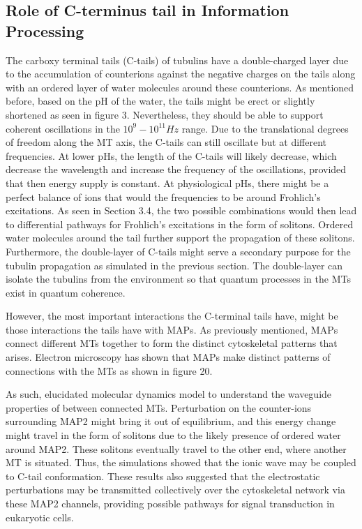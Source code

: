 \documentclass[letterpaper,final,times]{cas-dc}
\numberwithin{equation}{section}
\begin{document}
\subsection{Role of C-terminus tail in Information Processing}\noindent
The carboxy terminal tails (C-tails) of tubulins have a double-charged layer due to the accumulation of counterions against the negative charges on the tails along with an ordered layer of water molecules around these counterions. As mentioned before, based on the pH of the water, the tails might be erect or slightly shortened as seen in figure 3. Nevertheless, they should be able to support coherent oscillations in the $10^9 - 10^{11} Hz$ range\citep{94}. Due to the translational degrees of freedom along the MT axis, the C-tails can still oscillate but at different frequencies. At lower pHs, the length of the C-tails will likely decrease, which decrease the wavelength and increase the frequency of the oscillations, provided that then energy supply is constant. At physiological pHs, there might be a perfect balance of ions that would the frequencies to be around Frohlich’s excitations. As seen in Section 3.4, the two possible combinations would then lead to differential pathways for Frohlich’s excitations in the form of solitons. Ordered water molecules around the tail further support the propagation of these solitons. Furthermore, the double-layer of C-tails might serve a secondary purpose for the tubulin propagation as simulated in the previous section. The double-layer can isolate the tubulins from the environment so that quantum processes in the MTs exist in quantum coherence.

However, the most important interactions the C-terminal tails have, might be those interactions the tails have with MAPs. As previously mentioned, MAPs connect different MTs together to form the distinct cytoskeletal patterns that arises. Electron microscopy has shown that MAPs make distinct patterns of connections with the MTs as shown in figure 20.

As such, \citet{82}  elucidated molecular dynamics model to understand the waveguide properties of between connected MTs. Perturbation on the counter-ions surrounding MAP2 might bring it out of equilibrium, and this energy change might travel in the form of solitons due to the likely presence of ordered water around MAP2. These solitons eventually travel to the other end, where another MT is situated. Thus, the simulations showed that the ionic wave may be coupled to C-tail conformation. These results also suggested that the electrostatic perturbations may be transmitted collectively over the cytoskeletal network via these MAP2 channels, providing possible pathways for signal transduction in eukaryotic cells.
\end{document}
